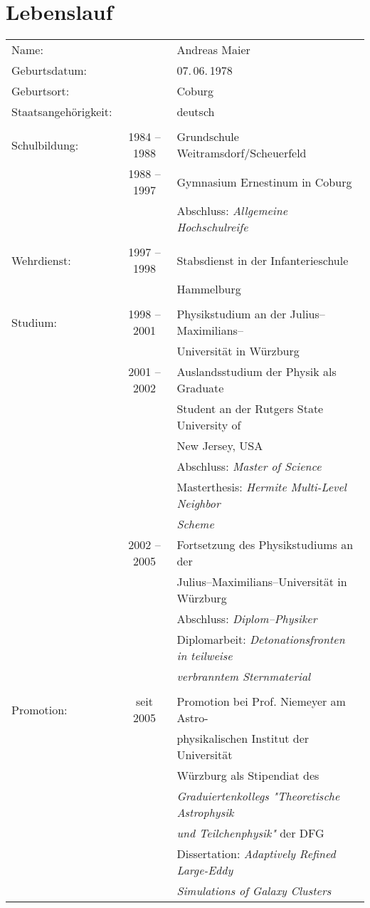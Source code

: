 \chapter*{Lebenslauf}

\begin{tabular}{lcl}
Name:&&Andreas Maier\\
Geburtsdatum:&& 07.\,06.\,1978\\
Geburtsort:&&Coburg\\
Staatsangehörigkeit:&&deutsch\\
\\
Schulbildung:& 1984 -- 1988 & Grundschule Weitramsdorf/Scheuerfeld\\
&1988 -- 1997 & Gymnasium Ernestinum in Coburg\\
&&Abschluss: \emph{Allgemeine Hochschulreife}\\
\\
Wehrdienst:&1997 -- 1998& Stabsdienst in der Infanterieschule \\
&&Hammelburg\\
\\
Studium:&1998 -- 2001& Physikstudium an der Julius--Maximilians--\\
&&Universität in Würzburg\\
&2001 -- 2002 & Auslandsstudium der Physik als Graduate \\
&& Student an der Rutgers State University of\\
&& New Jersey, USA\\
&&Abschluss: \emph{Master of Science}\\
&&Masterthesis: \emph{Hermite Multi-Level Neighbor}\\
&&\phantom{Masterthesis:\;} \emph{Scheme}\\
&2002 -- 2005 & Fortsetzung des Physikstudiums an der \\
&&Julius--Maximilians--Universität in Würzburg\\
&&Abschluss: \emph{Diplom--Physiker}\\
&&Diplomarbeit: \emph{Detonationsfronten in teilweise} \\
&&\phantom{Diplomarbeit:\;} \emph{verbranntem Sternmaterial}\\
\\
Promotion:&seit 2005&Promotion bei Prof. Niemeyer am Astro-\\
&& physikalischen Institut der Universität\\
&& Würzburg als Stipendiat des \\
&&\emph{Graduiertenkollegs "Theoretische Astrophysik}\\
&&\emph{und Teilchenphysik"} der DFG\\
&& Dissertation: \emph{Adaptively Refined Large-Eddy}\\
&&\phantom{Dissertation:\;} \emph{Simulations of Galaxy Clusters}
\end{tabular}

